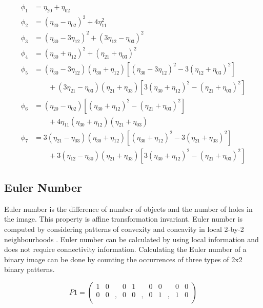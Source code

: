 \begin{subequations}
\begin{align}
\phi_1 &=\eta_{20}+\eta_{02} \\
\phi_2&=(\eta_{20}-\eta_{02})^2+4\eta^2_{11} \\
\phi_3&=(\eta_{30}-3\eta_{12})^2+(3\eta_{12}-\eta_{03})^2 \\
\phi_4&= (\eta_{30}+\eta_{12})^2+(\eta_{21}+\eta_{03})^2 \\
\phi_5&=(\eta_{30}-3\eta_{12})(\eta_{30}+\eta_{12})[(\eta_{30}-3\eta_{12})^2-3(\eta_{12}+\eta_{03})^2] \nonumber \\
&\qquad +(3\eta_{21}-\eta_{03})(\eta_{21}+\eta_{03})[3(\eta_{30}+\eta_{12})^2-(\eta_{21}+\eta_{03})^2] \\
\phi_6&=(\eta_{20}-\eta_{02})[(\eta_{30}+\eta_{12})^2-(\eta_{21}+\eta_{03})^2] \nonumber \\
&\qquad +4\eta_{11}(\eta_{30}+\eta_{12})(\eta_{21}+\eta_{03}) \\
\phi_7&=3(\eta_{21}-\eta_{03})(\eta_{30}+\eta_{12})[(\eta_{30}+\eta_{12})^2-3(\eta_{21}+\eta_{03})^2] \nonumber\\
&\qquad +3(\eta_{12}-\eta_{30})(\eta_{21}+\eta_{03})[3(\eta_{30}+\eta_{12})^2-(\eta_{21}+\eta_{03})^2]
\end{align}
\end{subequations}


\subsection{Euler Number}
\label{section_euler_number}
Euler number is the difference of number of objects and the number of holes in the image. This property is affine transformation invariant. Euler number is computed by considering patterns of convexity and concavity in local 2-by-2 neighbourhoods \cite{Pratt1991}. Euler number can be calculated by using local information and does not require connectivity information. Calculating the Euler number of a binary image can be done by counting the occurrences of three types of 2x2 binary patterns.

%
$$ P1=
\left(
  \begin{array}{ccccccccccc}
    1 & 0 &  & 0 & 1 &  & 0 & 0 &  & 0 & 0 \\
    0 & 0 &, & 0 & 0 &, & 0 & 1 &, & 1 & 0 \\
  \end{array}
\right)
$$

